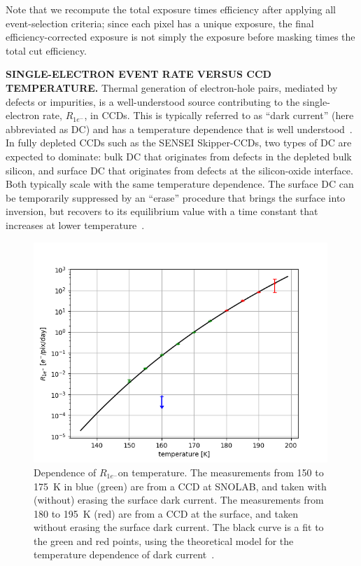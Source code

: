 \documentclass[aps,prl,twocolumn,showpacs,superscriptaddress,preprintnumbers]{revtex4-1}
\newcommand{\Rs}{$R_{1e^-}$}
\begin{document}
Note that we recompute the total exposure times efficiency after applying all event-selection criteria; since each pixel has a unique exposure, the final efficiency-corrected exposure is not simply the exposure before masking times the total cut efficiency.  


\vskip 3mm
\noindent\textbf{SINGLE-ELECTRON EVENT RATE VERSUS CCD TEMPERATURE.}
Thermal generation of electron-hole pairs, mediated by defects or impurities, is a well-understood source contributing to the single-electron rate, \Rs, in CCDs. This is typically referred to as ``dark current'' (here abbreviated as DC) and has a temperature dependence that is well understood~\cite{janesick2001scientific}. In fully depleted CCDs such as the SENSEI Skipper-CCDs, two types of DC are expected to dominate: bulk DC that originates from defects in the depleted bulk silicon, and surface DC that originates from defects at the silicon-oxide interface. Both typically scale with the same temperature dependence. 
The surface DC can be temporarily suppressed by an ``erase'' procedure that brings the surface into inversion, but recovers to its equilibrium value with a time constant that increases at lower temperature~\cite{69907, Holland:2003}.

\begin{figure}[b!]
\begin{center}
\includegraphics[width=0.99\textwidth]{figs/dc_vs_t.png}
\caption{Dependence of \Rs on temperature. The measurements from 150 to 175~K in blue (green) are from a CCD at SNOLAB, and taken with (without) erasing the surface dark current. The measurements from 180 to 195~K (red) are from a CCD at the surface, and taken without erasing the surface dark current. The black curve is a fit to the green and red points, using the theoretical model for the temperature dependence of dark current~\cite{janesick2001scientific}.
\vspace{-5mm}
}
\label{fig:dc_vs_t}
\end{center}
\end{figure}
\end{document}
